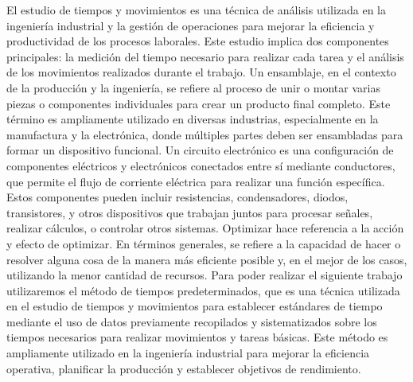 El estudio de tiempos y movimientos es una técnica de análisis utilizada en la ingeniería industrial y la gestión de operaciones para mejorar la eficiencia y productividad de los procesos laborales. Este estudio implica dos componentes principales: la medición del tiempo necesario para realizar cada tarea y el análisis de los movimientos realizados durante el trabajo. \cite{Estudiodetiempos}
Un ensamblaje, en el contexto de la producción y la ingeniería, se refiere al proceso de unir o montar varias piezas o componentes individuales para crear un producto final completo. Este término es ampliamente utilizado en diversas industrias, especialmente en la manufactura y la electrónica, donde múltiples partes deben ser ensambladas para formar un dispositivo funcional. \cite{Ensamble}
Un circuito electrónico es una configuración de componentes eléctricos y electrónicos conectados entre sí mediante conductores, que permite el flujo de corriente eléctrica para realizar una función específica. Estos componentes pueden incluir resistencias, condensadores, diodos, transistores, y otros dispositivos que trabajan juntos para procesar señales, realizar cálculos, o controlar otros sistemas. \cite{Circuitoelectrico}
Optimizar hace referencia a la acción y efecto de optimizar. En términos generales, se refiere a la capacidad de hacer o resolver alguna cosa de la manera más eficiente posible y, en el mejor de los casos, utilizando la menor cantidad de recursos. \cite{optimizacion}
Para poder realizar el siguiente trabajo utilizaremos el método de tiempos predeterminados, que es una técnica utilizada en el estudio de tiempos y movimientos para establecer estándares de tiempo mediante el uso de datos previamente recopilados y sistematizados sobre los tiempos necesarios para realizar movimientos y tareas básicas. Este método es ampliamente utilizado en la ingeniería industrial para mejorar la eficiencia operativa, planificar la producción y establecer objetivos de rendimiento.
